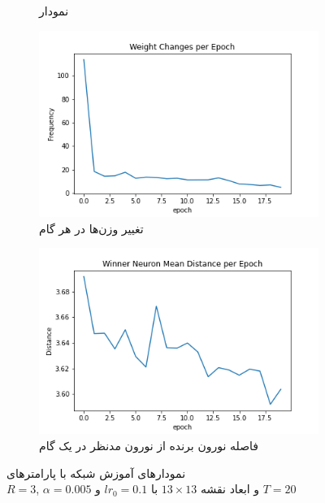 \documentclass[12pt, a4paper]{article}
\begin{document}
\begin{figure}[h]
\begin{subfigure}{0.45\linewidth}
        \caption{نمودار }
    \end{subfigure}
    \newline
    \begin{subfigure}{0.45\linewidth}
        \includegraphics[width=\linewidth]{images/q5/r15/weight_change.png}
        \caption{تغییر وزن‌ها در هر گام}
    \end{subfigure}
    \hfill
    \begin{subfigure}{0.45\linewidth}
        \includegraphics[width=\linewidth]{images/q5/r15/winner_distance.png}
        \caption{فاصله نورون برنده از نورون مدنظر در یک گام}
    \end{subfigure}
    \caption{نمودار‌های آموزش شبکه  با پارامتر‌های \\$R=3$, $\alpha=0.005$ و ابعاد نقشه $13 \times 13$ با $lr_0=0.1$ و $T=20$}
    \label{r15}
\end{figure}
\end{document}
